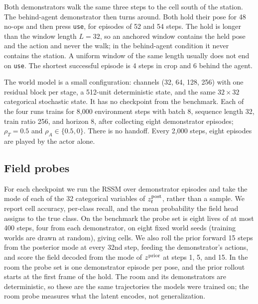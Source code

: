 Both demonstrators walk the same three steps to the cell south of the station.
The behind-agent demonstrator then turns around.
Both hold their pose for 48 no-ops and then press \texttt{use}, for episodes of 52 and 54 steps.
The hold is longer than the window length $L=32$, so an anchored window contains the held pose and the action and never the walk; in the behind-agent condition it never contains the station.
A uniform window of the same length usually does not end on \texttt{use}.
The shortest successful episode is 4 steps in crop and 6 behind the agent.

The world model is a small configuration: channels (32, 64, 128, 256) with one residual block per stage, a 512-unit deterministic state, and the same $32\times32$ categorical stochastic state.
It has no checkpoint from the benchmark.
Each of the four runs trains for 8,000 environment steps with batch 8, sequence length 32, train ratio 256, and horizon 8, after collecting eight demonstrator episodes; $\rho_T=0.5$ and $\rho_A\in\{0.5, 0\}$.
There is no handoff.
Every 2,000 steps, eight episodes are played by the actor alone.

\subsection{Field probes}
\label{sec:setup-probe}

For each checkpoint we run the RSSM over demonstrator episodes and take the mode of each of the 32 categorical variables of $z^{\mathrm{post}}_t$, rather than a sample.
We report cell accuracy, per-class recall, and the mean probability the field head assigns to the true class.
On the benchmark the probe set is eight lives of at most 400 steps, four from each demonstrator, on eight fixed world seeds (training worlds are drawn at random), giving \FieldCells{} cells.
We also roll the prior forward 15 steps from the posterior mode at every 32nd step, feeding the demonstrator's actions, and score the field decoded from the mode of $z^{\mathrm{prior}}$ at steps 1, 5, and 15.
In the room the probe set is one demonstrator episode per pose, and the prior rollout starts at the first frame of the hold.
The room and its demonstrators are deterministic, so these are the same trajectories the models were trained on; the room probe measures what the latent encodes, not generalization.
